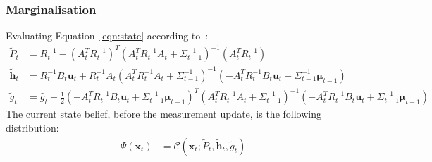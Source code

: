 \subsubsection{Marginalisation}
\label{subsubsection:marginalisation}
Evaluating Equation~\ref{eqn:state} according to~\cite{Koller_canonical}:
\begin{align}
\widetilde{P}_{t} &= R_{t}^{-1} - \left( A_{t}^{T} R_{t}^{-1} \right)^{T} \left( A_{t}^{T} R_{t}^{-1} A_{t} + \Sigma_{t-1}^{-1} \right)^{-1} \left( A_{t}^{T} R_{t}^{-1} \right) \label{eqn:p_direct} \\
\widetilde{\pmb{h}}_{t} &= R_{t}^{-1} B_{t} \pmb{u}_{t} + R_{t}^{-1}A_{t} \left(A_{t}^{T} R_{t}^{-1} A_{t} + \Sigma^{-1}_{t-1} \right)^{-1} \left( -A_{t}^{T} R_{t}^{-1} B_{t} \pmb{u}_{t} + \Sigma^{-1}_{t-1} \pmb{\mu}_{t-1} \right) \label{eqn:h_direct} \\
\widetilde{g}_{t} &= \hat{g}_{t} -\frac{1}{2} \left( -A_{t}^{T} R_{t}^{-1} B_{t} \pmb{u}_{t} + \Sigma^{-1}_{t-1} \pmb{\mu}_{t-1} \right)^{T} \left(A_{t}^{T} R_{t}^{-1} A_{t} + \Sigma^{-1}_{t-1} \right)^{-1} \left( -A_{t}^{T} R_{t}^{-1} B_{t} \pmb{u}_{t} + \Sigma^{-1}_{t-1} \pmb{\mu}_{t-1} \right) \nonumber
\end{align}
The current state belief, before the measurement update, is the following distribution:
\begin{align}
\Psi({\pmb{x}_{t}}) &= \mathcal{C}\left( \pmb{x}_{t}; \widetilde{P}_t, \widetilde{\pmb{h}}_{t}, \widetilde{g}_{t} \right)
\end{align}

